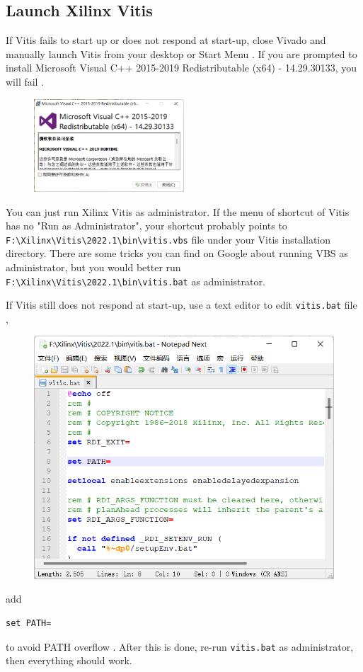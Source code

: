 \documentclass[a4paper,12pt,twoside]{article}
\begin{document}
\subsection{Launch Xilinx Vitis}\label{AA2}
If Vitis fails to start up or does not respond at start-up, close Vivado and manually launch Vitis from your desktop or Start Menu \cite{vitis1}.
If you are prompted to install Microsoft Visual C++ 2015-2019 Redistributable (x64) - 14.29.30133, you will fail \cite{vivadotcl}.
\begin{figure}[H]
    \centering
    \includegraphics[width=0.5\textwidth]{images/10.png}
\end{figure}
You can just run Xilinx Vitis as administrator. If the menu of shortcut of Vitis has no "Run as Administrator", your shortcut probably points to\\ \texttt{F:\textbackslash Xilinx\textbackslash Vitis\textbackslash 2022.1\textbackslash bin\textbackslash vitis.vbs} file under your Vitis installation directory. There are some tricks you can find on Google about running VBS as administrator, but you would better run \texttt{F:\textbackslash Xilinx\textbackslash Vitis\textbackslash 2022.1\textbackslash bin\textbackslash vitis.bat} as administrator.

If Vitis still does not respond at start-up, use a text editor to edit \texttt{vitis.bat} file \cite{vitisrespond},
\begin{figure}[H]
    \centering
    \includegraphics[width=\textwidth]{images/11.png}
\end{figure}
add
\begin{verbatim}
set PATH=
\end{verbatim}
to avoid PATH overflow \cite{vitis2}. After this is done, re-run \texttt{vitis.bat} as administrator, then everything should work.
\end{document}
